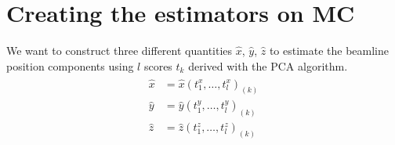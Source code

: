 \section{Creating the estimators on MC}

We want to construct three different quantities $\hat{x}$, $\hat{y}$, $\hat{z}$ to estimate the beamline position components using $l$ scores $t_k$ derived with the PCA algorithm.
\begin{align}
\begin{split}
    \hat{x} &= \hat{x}(t^x_1, \dots, t^x_l)_{(k)} \\
    \hat{y} &= \hat{y}(t^y_1, \dots, t^y_l)_{(k)} \\\label{x_hat}
    \hat{z} &= \hat{z}(t^z_1, \dots, t^z_l)_{(k)} 
    \end{split}
\end{align} 

